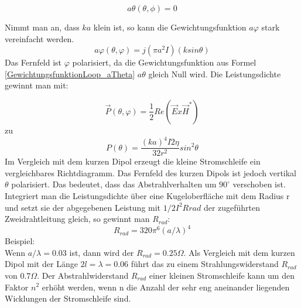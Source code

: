 \begin{equation}\label{GewichtungsfunktionLoop_aTheta}
a\theta(\theta, \phi) =0
\end{equation}

Nimmt man  an, dass $ka$ klein ist, so kann  die Gewichtungsfunktion $a\varphi$ stark vereinfacht werden.
\begin{equation}
a\varphi(\theta,\varphi)=j(\pi a^{2}I)(k sin \theta)
\end{equation}
Das Fernfeld   ist  $\varphi$ polarisiert, da die Gewichtungsfunktion aus Formel \ref{GewichtungsfunktionLoop_aTheta}  $a\theta$ gleich Null wird.  Die Leistungsdichte gewinnt man mit: 

\begin{equation}
\vec P(\theta,\varphi)=\frac{1}{2}Re(\vec E x \vec H^*)
\end{equation}
zu
\begin{equation}
P(\theta)=\frac{(ka)^{4}I{2}\eta}{32r^{2}}sin^{2}\theta
\end{equation}
Im Vergleich mit dem kurzen Dipol erzeugt die kleine Stromschleife ein vergleichbares Richtdiagramm. Das Fernfeld des kurzen Dipols ist jedoch vertikal $\theta$ polarisiert. Das bedeutet, dass das Abstrahlverhalten um $90^\circ$ verschoben ist. Integriert man die Leistungsdichte über eine Kugeloberfläche mit dem Radius r  und setzt sie der abgegebenen Leistung mit $1/2 I^{2}Rrad $ der zugeführten Zweidrahtleitung gleich, so gewinnt man $R_{rad}$:
\begin{equation}
R_{rad} = 320\pi^{6} (a/\lambda)^{4}\label{eq:RradLoop}
\end{equation}
Beispiel:\\
Wenn $a/\lambda = 0.03$ ist, dann wird der $R_{rad} = 0.25\Omega$. Als Vergleich mit dem kurzen Dipol mit der Länge $2l=\lambda= 0.06$ führt das zu einem Strahlungswiderstand $R_{rad}$ von $0.7\Omega$.  Der Abstrahlwiderstand $R_{rad}$ einer kleinen Stromschleife kann um den Faktor $n^{2}$ erhöht werden, wenn n die Anzahl der sehr eng aneinander liegenden Wicklungen der Stromschleife sind. 



